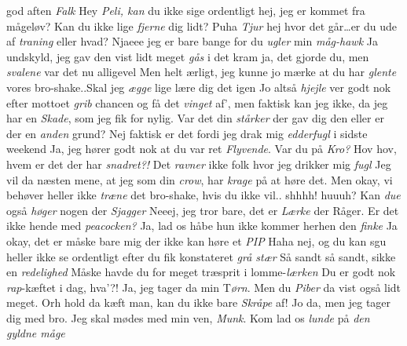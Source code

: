 \documentclass[a4paper,11pt]{article}
\begin{document}
\begin{sketch}


 god aften \textit{Falk}
 Hey \textit{Peli, kan} du ikke sige ordentligt hej, jeg er kommet fra mågeløv?
 Kan du ikke lige \textit{fjerne} dig lidt? 
 Puha \textit{Tjur} hej hvor det går\ldots er du ude af \textit{traning} eller hvad?
 Njaeee jeg er bare bange for du \textit{ugler} min \textit{måg-hawk}
 Ja undskyld, jeg gav den vist lidt meget \textit{gås} i det kram
 ja, det gjorde du, men \textit{svalene} var det nu alligevel
 Men helt ærligt, jeg kunne jo mærke at du har \textit{glente} vores bro-shake..Skal jeg \textit{ægge} lige lære dig det igen
 Jo altså \textit{hjejle} ver godt nok efter mottoet \textit{grib} chancen og få det \textit{vinget} af’, men faktisk kan jeg ikke, da jeg har en \textit{Skade}, som jeg fik for nylig.
 Var det din \textit{stårker} der gav dig den eller er der en \textit{anden} grund?
 Nej faktisk er det fordi jeg drak mig \textit{edderfugl} i sidste weekend
 Ja, jeg hører godt nok at du var ret \textit{Flyvende}. Var du på \textit{Kro?}
 Hov hov, hvem er det der har \textit{snadret?!} Det \textit{ravner} ikke folk hvor jeg drikker mig \textit{fugl}
 Jeg vil da næsten mene, at jeg som din \textit{crow}, har \textit{krage} på at høre det. Men okay, vi behøver heller ikke \textit{træne} det bro-shake, hvis du ikke vil..
 shhhh!
 huuuh?
 Kan \textit{due} også \textit{høger} nogen der \textit{Sjagger}
 Neeej, jeg tror bare, det er \textit{Lærke} der Råger. 
 Er det ikke hende med \textit{peacocken?}
 Ja, lad os håbe hun ikke kommer herhen den \textit{finke}
 Ja okay, det er måske bare mig der ikke kan høre et \textit{PIP} 
 Haha nej, og du kan sgu heller ikke se ordentligt efter du fik konstateret \textit{grå stær} 
 Så sandt så sandt, sikke en \textit{redelighed}
 Måske havde du for meget træsprit i lomme-\textit{lærken}
 Du er godt nok \textit{rap}-kæftet i dag, hva’?!
 Ja, jeg tager da min T\textit{ørn}. Men du \textit{Piber} da vist også lidt meget.
 Orh hold da kæft man, kan du ikke bare \textit{Skråpe} af!
 Jo da, men jeg tager dig med bro. Jeg skal mødes med min ven, \textit{Munk}. Kom lad os \textit{lunde} på \textit{den gyldne måge}





\end{sketch}
\end{document}
